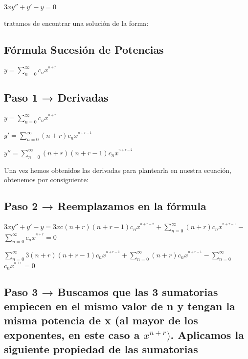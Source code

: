 \documentclass{article}
\begin{document}
\begin{center}
\Large$ 3xy'' + y' - y = 0$
\end{center}

\large tratamos de encontrar una solución de la forma:

\subsection{Fórmula Sucesión de Potencias}
\begin{center}
\Large $ y = $$\sum_{n=0}^{\infty}$$c_{n}x^{^{n+r}}$
\end{center}

\subsection{Paso 1 → Derivadas}
\begin{center}
\Large$ y = $$\sum_{n=0}^{\infty}$$c_{n}x^{^{n+r}}$
\end{center}

\begin{center}
\Large$ y' = $$\sum_{n=0}^{\infty}$$(n + r) c_{n}x^{^{n+r-1}}$
\end{center}

\begin{center}
\Large$ y'' = $$\sum_{n=0}^{\infty}$$(n + r) ( n + r - 1) c_{n}x^{^{n+r-2}}$
\end{center}

\large Una vez hemos obtenidos las derivadas para plantearla en nuestra ecuación, obtenemos por consiguiente:

\subsection{Paso 2 → Reemplazamos en la fórmula}
\large$3xy''+y'-y= 3x $c$(n + r) ( n + r - 1) c_{n}x^{^{n+r-2}} + $$\sum_{n=0}^{\infty}$$(n + r) c_{n}x^{^{n+r-1}} - $$\sum_{n=0}^{\infty}$$c_{n}x^{^{n+r}}=0$\newline


\Large $\sum_{n=0}^{\infty} $$ 3 (n + r) (n + r - 1) c_{n}x^{^{n+r-1}} + $$\sum_{n=0}^{\infty}$$(n + r) c_{n}x^{^{n+r-1}} - $$\sum_{n=0}^{\infty}$$c_{n}x^{^{n+r}}=0$\newline

\subsection{Paso 3 → Buscamos que las 3 sumatorias empiecen en el mismo valor de n y tengan la misma potencia de x (al mayor de los exponentes, en este caso a $x^{n+r})$. Aplicamos la siguiente propiedad de las sumatorias}
\end{document}
